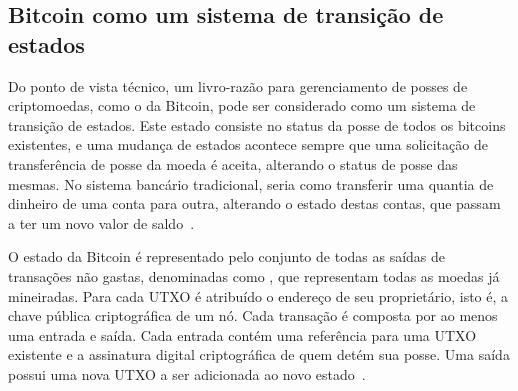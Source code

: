 \subsection{Bitcoin como um sistema de transição de estados} \label{tex:fund:blockchain:transition_system}

Do ponto de vista técnico, um livro-razão para gerenciamento de posses de criptomoedas, como o da Bitcoin, pode ser considerado como um sistema de transição de estados. Este estado consiste no status da posse de todos os bitcoins existentes, e uma mudança de estados acontece sempre que uma solicitação de transferência de posse da moeda é aceita, alterando o status de posse das mesmas. No sistema bancário tradicional, seria como transferir uma quantia de dinheiro de uma conta para outra, alterando o estado destas contas, que passam a ter um novo valor de saldo~\cite{ethereum2014whitepaper}.

O estado da Bitcoin é representado pelo conjunto de todas as saídas de transações não gastas, denominadas como , que representam todas as moedas já mineiradas. Para cada UTXO é atribuído o endereço de seu proprietário, isto é, a chave pública criptográfica de um nó. Cada transação é composta por ao menos uma entrada e saída. Cada entrada contém uma referência para uma UTXO existente e a assinatura digital criptográfica de quem detém sua posse. Uma saída possui uma nova UTXO a ser adicionada ao novo estado~\cite{ethereum2014whitepaper}. 

